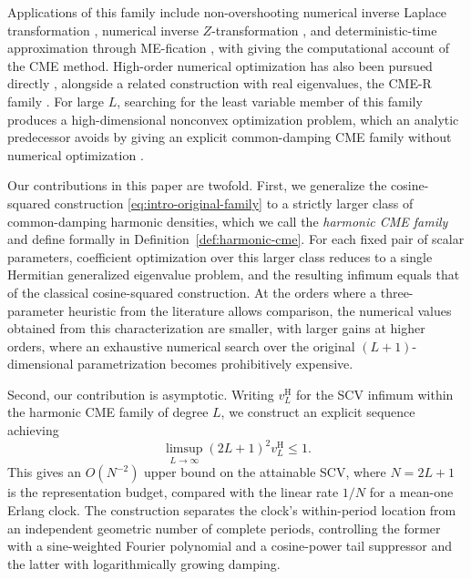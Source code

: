 \documentclass[11pt]{article}
\numberwithin{equation}{section}
\theoremstyle{remark}
\newcommand{\vH}{v^{\mathrm H}}
\begin{document}
Applications of this family include non-overshooting numerical inverse Laplace transformation \citep{HorvathTalyigasTelek2018,HorvathEtAl2020NILT}, numerical inverse $Z$-transformation \citep{HorvathMeszarosTelek2020}, and deterministic-time approximation through ME-fication \citep{AkarEtAl2021MEfication,Telek2022Transient}, with \citet{AlmousaEtAl2022CME} giving the computational account of the CME method. High-order numerical optimization has also been pursued directly \citep{HorvathHorvathTelek2020,AlmousaTelek2021}, alongside a related construction with real eigenvalues, the CME-R family \citep{MeszarosTelek2022}. For large $L$, searching for the least variable member of this family produces a high-dimensional nonconvex optimization problem, which an analytic predecessor avoids by giving an explicit common-damping CME family without numerical optimization \citep{BattagliolaPeralta2026OptFree}.

Our contributions in this paper are twofold. First, we generalize the cosine-squared construction \eqref{eq:intro-original-family} to a strictly larger class of common-damping harmonic densities, which we call the \emph{harmonic CME family} and define formally in Definition~\ref{def:harmonic-cme}. For each fixed pair of scalar parameters, coefficient optimization over this larger class reduces to a single Hermitian generalized eigenvalue problem, and the resulting infimum equals that of the classical cosine-squared construction. At the orders where a three-parameter heuristic from the literature allows comparison, the numerical values obtained from this characterization are smaller, with larger gains at higher orders, where an exhaustive numerical search over the original $(L+1)$-dimensional parametrization becomes prohibitively expensive.

Second, our contribution is asymptotic. Writing $\vH_L$ for the SCV infimum within the harmonic CME family of degree $L$, we construct an explicit sequence achieving
\begin{equation}\label{eq:intro-limsup}
  \limsup_{L\to\infty}(2L+1)^2\vH_L\leq1.
\end{equation}
This gives an $O(N^{-2})$ upper bound on the attainable SCV, where $N=2L+1$ is the representation budget, compared with the linear rate $1/N$ for a mean-one Erlang clock. The construction separates the clock's within-period location from an independent geometric number of complete periods, controlling the former with a sine-weighted Fourier polynomial and a cosine-power tail suppressor and the latter with logarithmically growing damping.
\end{document}
